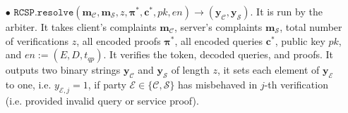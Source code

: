 \begin{definition}[RC-S-P Scheme]
\begin{itemize}

\


\item[$\bullet$] $\mathtt{RCSP}.\mathtt{resolve}(\bm{m}_{\scriptscriptstyle \mathcal{C}},\bm{m}_{\scriptscriptstyle \mathcal{S}},z, {\bm{\pi}}^{\scriptscriptstyle *}, {\bm{c}}^{\scriptscriptstyle *},pk,en)\rightarrow (\bm{y}_{\scriptscriptstyle \mathcal C},\bm{y}_{\scriptscriptstyle \mathcal S})$. It is run by the arbiter. It takes client's complaints $\bm{m}_{\scriptscriptstyle \mathcal{C}}$,   server's complaints   $\bm{m}_{\scriptscriptstyle \mathcal{S}}$, total number of verifications $z$, all encoded proofs $ {\bm{\pi}}^{\scriptscriptstyle *}$, all encoded queries $ {\bm{c}}^{\scriptscriptstyle *}$, public key $pk$, and $en:=(E,D,t_{\scriptscriptstyle qp})$.  It verifies the token,   decoded queries, and proofs.  It outputs two binary strings $\bm{y}_{\scriptscriptstyle \mathcal C}$ and $\bm{y}_{\scriptscriptstyle \mathcal S}$ of length $z$, it sets each element of $\bm{y}_{\scriptscriptstyle \mathcal E}$ to one, i.e. $y_{\scriptscriptstyle \mathcal E,j}=1$, if party $\mathcal{E}\in\{\mathcal{C},\mathcal{S}\}$ has misbehaved in $j$-th verification (i.e. provided invalid query or service proof). 



\
	

\end{itemize}
\end{definition}
